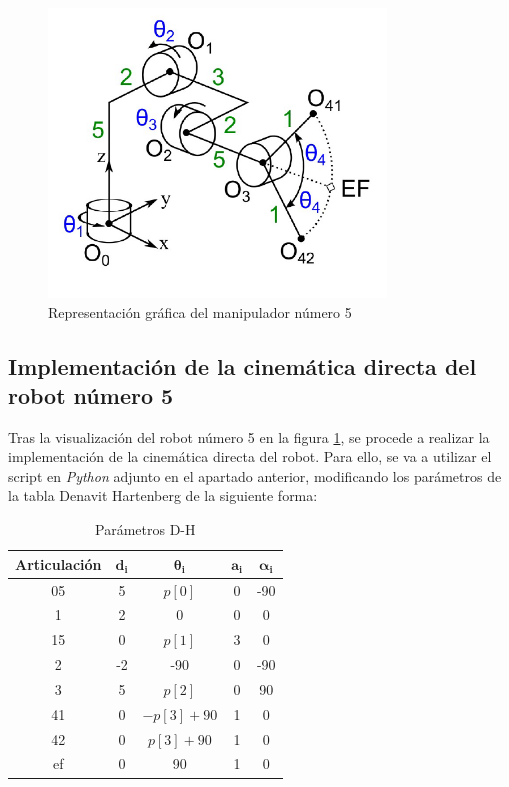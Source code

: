 \documentclass[11pt]{report}
\begin{document}
\begin{figure}[H]
    \centering
    \includegraphics[width=0.8\textwidth]{src/img/Manipulador-5.png}
    \caption{Representación gráfica del manipulador número 5}
    \label{fig:robot5}
\end{figure}

\subsection{Implementación de la cinemática directa del robot número 5}

Tras la visualización del robot número 5 en la figura \ref{fig:robot5}, se procede a realizar la implementación de la cinemática directa del robot. Para ello, se va a utilizar el script en \emph{Python} adjunto en el apartado anterior, modificando los parámetros de la tabla Denavit Hartenberg de la siguiente forma:

\begin{table}[htbp]
  \centering
  \caption{Parámetros D-H}
  \begin{tabular}{|c|c|c|c|c|}
      \hline
      \textbf{Articulación} & $\mathbf{d_i}$ & $\mathbf{\theta_i}$ & $\mathbf{a_i}$ & $\mathbf{\alpha_i}$ \\
      \hline
      05 & 5 & $p[0]$ & 0 & -90 \\
      1 & 2 & 0 & 0 & 0 \\
      15 & 0 & $p[1]$ & 3 & 0 \\
      2 & -2 & -90 & 0 & -90 \\
      3 & 5 & $p[2]$ & 0 & 90 \\
      41 & 0 & $-p[3] + 90$ & 1 & 0 \\
      42 & 0 & $p[3] + 90$ & 1 & 0 \\
      ef & 0 & 90 & 1 & 0 \\
      \hline
  \end{tabular}
\end{table}
\end{document}
